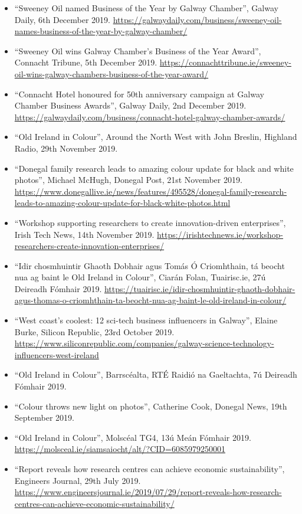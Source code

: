 \documentclass[10pt,a4paper]{res} %
\begin{document}
\begin{resume}
{\begin{itemize}
\item ``Sweeney Oil named Business of the Year by Galway Chamber'', Galway Daily, 6th December 2019. \url{https://galwaydaily.com/business/sweeney-oil-names-business-of-the-year-by-galway-chamber/}
\item ``Sweeney Oil wins Galway Chamber's Business of the Year Award'', Connacht Tribune, 5th December 2019. \url{https://connachttribune.ie/sweeney-oil-wins-galway-chambers-business-of-the-year-award/}
\item ``Connacht Hotel honoured for 50th anniversary campaign at Galway Chamber Business Awards'', Galway Daily, 2nd December 2019. \url{https://galwaydaily.com/business/connacht-hotel-galway-chamber-awards/}
\item ``Old Ireland in Colour'', Around the North West with John Breslin, Highland Radio, 29th November 2019.
\item ``Donegal family research leads to amazing colour update for black and white photos'', Michael McHugh, Donegal Post, 21st November 2019. \url{https://www.donegallive.ie/news/features/495528/donegal-family-research-leads-to-amazing-colour-update-for-black-white-photos.html}
\item ``Workshop supporting researchers to create innovation-driven enterprises'', Irish Tech News, 14th November 2019. \url{https://irishtechnews.ie/workshop-researchers-create-innovation-enterprises/}
\item ``Idir chosmhuintir Ghaoth Dobhair agus Tom\'{a}s \'{O} Criomhthain, t\'{a} beocht nua ag baint le Old Ireland in Colour'', Ciar\'{a}n Folan, Tuairisc.ie, 27\'{u} Deireadh F\'{o}mhair 2019. \url{https://tuairisc.ie/idir-chosmhuintir-ghaoth-dobhair-agus-thomas-o-criomhthain-ta-beocht-nua-ag-baint-le-old-ireland-in-colour/}
\item ``West coast's coolest: 12 sci-tech business influencers in Galway'', Elaine Burke, Silicon Republic, 23rd October 2019. \url{https://www.siliconrepublic.com/companies/galway-science-technology-influencers-west-ireland}
\item ``Old Ireland in Colour'', Barrsc\'{e}alta, RT\'{E} Raidi\'{o} na Gaeltachta, 7\'{u} Deireadh F\'{o}mhair 2019.
\item ``Colour throws new light on photos'', Catherine Cook, Donegal News, 19th September 2019.
\item ``Old Ireland in Colour'', Molsc\'{e}al TG4, 13\'{u} Me\'{a}n F\'{o}mhair 2019. \url{https://molsceal.ie/siamsaiocht/alt/?CID=6085979250001}
\item ``Report reveals how research centres can achieve economic sustainability'', Engineers Journal, 29th July 2019. \url{https://www.engineersjournal.ie/2019/07/29/report-reveals-how-research-centres-can-achieve-economic-sustainability/}

\end{itemize}}
\end{resume}
\end{document}
